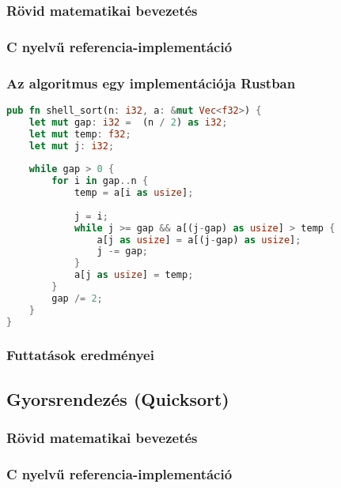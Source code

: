 \subsubsection{Rövid matematikai bevezetés}
\subsubsection{C nyelvű referencia-implementáció}
\begin{cppstyle}
\end{cppstyle}
\subsubsection{Az algoritmus egy implementációja Rustban}
\begin{lstlisting}[language=Rust]
pub fn shell_sort(n: i32, a: &mut Vec<f32>) {
	let mut gap: i32 =  (n / 2) as i32;
	let mut temp: f32;
	let mut j: i32;
	
	while gap > 0 {
		for i in gap..n {
			temp = a[i as usize];
			
			j = i;
			while j >= gap && a[(j-gap) as usize] > temp {
				a[j as usize] = a[(j-gap) as usize];
				j -= gap;
			}
			a[j as usize] = temp;
		}
		gap /= 2;
	}
}
\end{lstlisting}
\subsubsection{Futtatások eredményei} %

\subsection{Gyorsrendezés (Quicksort)}
\subsubsection{Rövid matematikai bevezetés}
\subsubsection{C nyelvű referencia-implementáció}
\begin{cppstyle}
\end{cppstyle}
